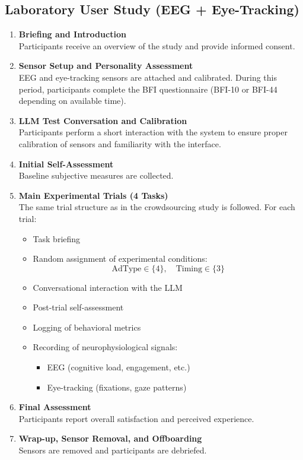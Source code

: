 \documentclass{article}
\begin{document}
\newpage

\subsection{Laboratory User Study (EEG + Eye-Tracking)}

\begin{enumerate}
    \item \textbf{Briefing and Introduction} \\
    Participants receive an overview of the study and provide informed consent.

    \item \textbf{Sensor Setup and Personality Assessment} \\
    EEG and eye-tracking sensors are attached and calibrated. During this period, participants complete the BFI questionnaire (BFI-10 or BFI-44 depending on available time).

    \item \textbf{LLM Test Conversation and Calibration} \\
    Participants perform a short interaction with the system to ensure proper calibration of sensors and familiarity with the interface.

    \item \textbf{Initial Self-Assessment} \\
    Baseline subjective measures are collected.

    \item \textbf{Main Experimental Trials (4 Tasks)} \\
    The same trial structure as in the crowdsourcing study is followed. For each trial:
    \begin{itemize}
        \item Task briefing
        \item Random assignment of experimental conditions:
        \[
        \text{AdType} \in \{4\}, \quad \text{Timing} \in \{3\}
        \]
        \item Conversational interaction with the LLM
        \item Post-trial self-assessment
        \item Logging of behavioral metrics
        \item Recording of neurophysiological signals:
        \begin{itemize}
            \item EEG (cognitive load, engagement, etc.)
            \item Eye-tracking (fixations, gaze patterns)
        \end{itemize}
    \end{itemize}

    \item \textbf{Final Assessment} \\
    Participants report overall satisfaction and perceived experience.

    \item \textbf{Wrap-up, Sensor Removal, and Offboarding} \\
    Sensors are removed and participants are debriefed.
\end{enumerate}
\end{document}
